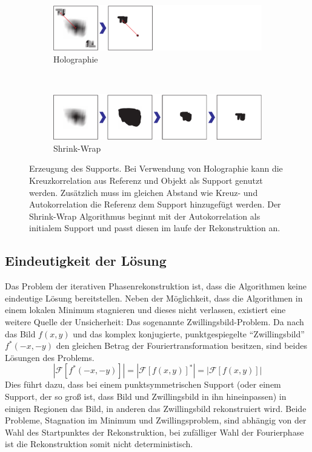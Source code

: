 \begin{figure}
	\centering
	\begin{subfigure}[b]{0.9\textwidth}
		\includegraphics[width=\textwidth]{images/support_holo.pdf}
		\caption{Holographie}
	\end{subfigure}\\

	\begin{subfigure}[b]{0.9\textwidth}
		\includegraphics[width=\textwidth]{images/support_sw.pdf}
		\caption{Shrink-Wrap}	
	\end{subfigure}
	
	\caption[Supportgenerierung]{Erzeugung des Supports. Bei Verwendung von Holographie kann die Kreuzkorrelation aus Referenz und Objekt als Support genutzt werden. Zusätzlich muss im gleichen Abstand wie Kreuz- und Autokorrelation die Referenz dem Support hinzugefügt werden. Der Shrink-Wrap Algorithmus beginnt mit der Autokorrelation als initialem Support und passt diesen im laufe der Rekonstruktion an.}
	\label{fig:support}
\end{figure} 

\subsection{Eindeutigkeit der Lösung}
Das Problem der iterativen Phasenrekonstruktion ist, dass die Algorithmen keine eindeutige Lösung bereitstellen. Neben der Möglichkeit, dass die Algorithmen in einem lokalen Minimum stagnieren und dieses nicht verlassen, existiert eine weitere Quelle der Unsicherheit: Das sogenannte Zwillingsbild-Problem. Da nach  das Bild $f(x,y)$ und das komplex konjugierte, punktgespiegelte "`Zwillingsbild"'  $f^*(-x,-y)$ den gleichen Betrag der Fouriertransformation besitzen, sind beides Lösungen des Problems.
\begin{equation}
	\label{eq:zwilling}
	\left|\mathscr{F}[f^*(-x,-y)]\right|=\left|\mathscr{F}[f(x,y)]^*\right|=\left|\mathscr{F}[f(x,y)]\right|
\end{equation}
Dies führt dazu, dass bei einem punktsymmetrischen Support (oder einem Support, der so groß ist, dass Bild und Zwillingsbild in ihn hineinpassen) in einigen Regionen das Bild, in anderen das Zwillingsbild rekonstruiert wird. Beide Probleme, Stagnation im Minimum und Zwillingsproblem, sind abhängig von der Wahl des Startpunktes der Rekonstruktion, bei zufälliger Wahl der Fourierphase ist die Rekonstruktion somit nicht deterministisch.

